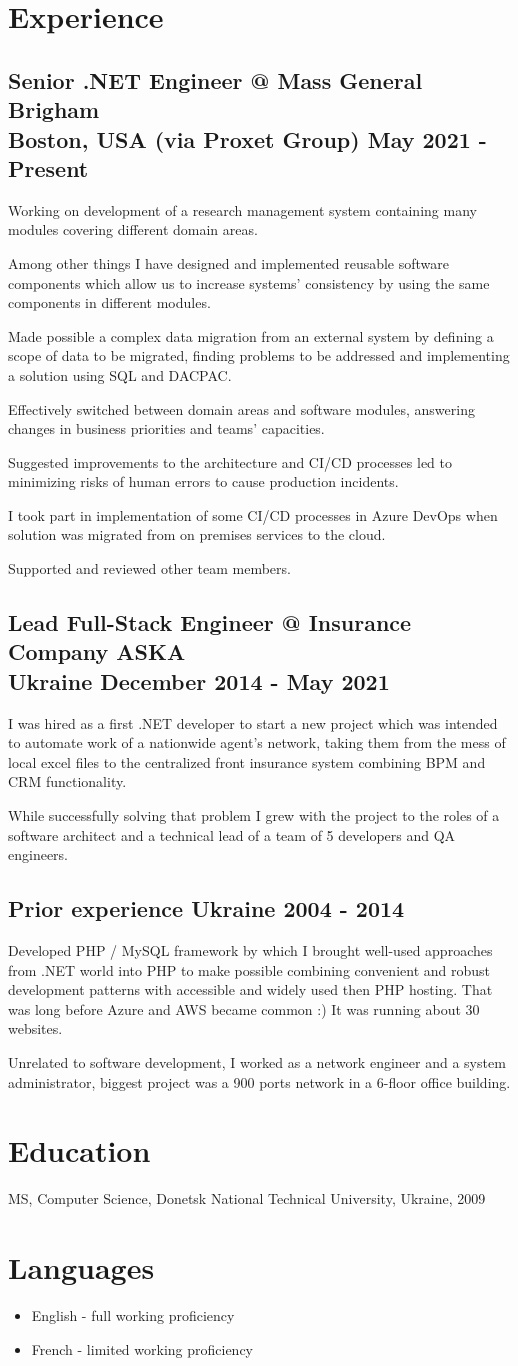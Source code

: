 \documentclass[letterpaper,10pt]{article}
\makeatletter
\newcommand{\proj}[4]{
  \subsection{\textbf{#1} #2 \hfill #3 - #4}
}
\newcommand{\job}[5]{
  \subsection{\textbf{#1} @ \textbf{#2} \\ #3 \hfill #4 - #5}
}
\makeatother
\begin{document}
\section{Experience}
\job{Senior .NET Engineer}{Mass General Brigham}{Boston, USA (via Proxet Group)}{May 2021}{Present}

Working on development of a research management system containing many modules covering different domain areas.

Among other things I have designed and implemented reusable software components which allow us to increase systems’ consistency by using the same components in different modules.

Made possible a complex data migration from an external system by defining a scope of data to be migrated, finding problems to be addressed and implementing a solution using SQL and DACPAC.

Effectively switched between domain areas and software modules, answering changes in business priorities and teams’ capacities.

Suggested improvements to the architecture and CI/CD processes led to minimizing risks of human errors to cause production incidents.

I took part in implementation of some CI/CD processes in Azure DevOps when solution was migrated from on premises services to the cloud.

Supported and reviewed other team members.

\job{Lead Full-Stack Engineer}{Insurance Company ASKA}{Ukraine}{December 2014}{May 2021}

I was hired as a first .NET developer to start a new project which was intended to automate work of a nationwide agent’s network, taking them from the mess of local excel files to the centralized front insurance system combining BPM and CRM functionality.

While successfully solving that problem I grew with the project to the roles of a software architect and a technical lead of a team of 5 developers and QA engineers.

\proj{Prior experience}{Ukraine}{2004}{2014}

Developed PHP / MySQL framework by which I brought well-used approaches from .NET world into PHP to make possible combining convenient and robust development patterns with accessible and widely used then PHP hosting. That was long before Azure and AWS became common :) It was running about 30 websites.

Unrelated to software development, I worked as a network engineer and a system administrator, biggest project was a 900 ports network in a 6-floor office building.

\section{Education}

MS, Computer Science, Donetsk National Technical University, Ukraine, 2009

\section{Languages}
\begin{itemize}
    \item English - full working proficiency
    \item French - limited working proficiency
\end{itemize}
\end{document}
